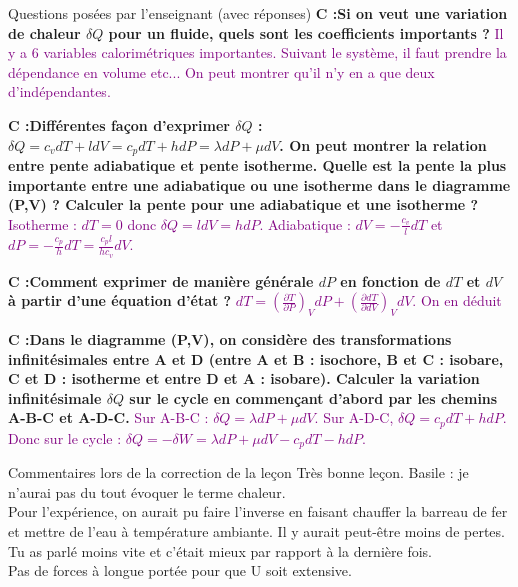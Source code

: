 \begin{reportBlock}{Questions posées par l’enseignant (avec réponses)}
  \textbf{C :Si on veut une variation de chaleur $\delta Q$ pour un fluide, quels sont les coefficients importants ?}  \textcolor{purple}{Il y a 6 variables calorimétriques importantes. Suivant le système, il faut prendre la dépendance en volume etc... On peut montrer qu'il n'y en a que deux d'indépendantes.} \newline
  
  \textbf{C :Différentes façon d'exprimer $\delta Q$ : $\delta Q = c_vdT + ldV = c_pdT + hdP = \lambda dP + \mu dV$. On peut montrer la relation entre pente adiabatique et pente isotherme. Quelle est la pente la plus importante entre une adiabatique ou une isotherme dans le diagramme (P,V) ? Calculer la pente pour une adiabatique et une isotherme ? }  \textcolor{purple}{Isotherme : $dT=0$ donc $\delta Q= ldV = hdP$. Adiabatique : $dV = -\frac{c_v}{l}dT$ et $dP = -\frac{c_p}{h}dT= \frac{c_pl}{hc_v}dV$.} \newline
  
  \textbf{C :Comment exprimer de manière générale $dP$ en fonction de $dT$ et $dV$ à partir d'une équation d'état ?}  \textcolor{purple}{$dT = (\frac{\partial{T}}{\partial{P}})_VdP + (\frac{\partial{d}T}{\partial{d}V})_VdV$. On en déduit } \newline
  
  \textbf{C :Dans le diagramme (P,V), on considère des transformations infinitésimales entre A et D (entre A et B : isochore, B et C : isobare, C et D : isotherme et entre D et A : isobare). Calculer la variation infinitésimale $\delta Q$ sur le cycle en commençant d'abord par les chemins A-B-C et A-D-C.}  \textcolor{purple}{Sur A-B-C : $\delta Q = \lambda dP + \mu dV$. Sur A-D-C, $\delta Q = c_pdT + hdP$. Donc sur le cycle : $\delta Q = -\delta W = \lambda dP + \mu dV - c_pdT - hdP$. } \newline
  
  
\end{reportBlock}


\begin{reportBlock}{Commentaires lors de la correction de la leçon}
Très bonne leçon. Basile : je n'aurai pas du tout évoquer le terme chaleur.\\
Pour l'expérience, on aurait pu faire l'inverse en faisant chauffer la barreau de fer et mettre de l'eau à température ambiante. Il y aurait peut-être moins de pertes.\\
Tu as parlé moins vite et c'était mieux par rapport à la dernière fois.\\
Pas de forces à longue portée pour que U soit extensive.


\end{reportBlock}



